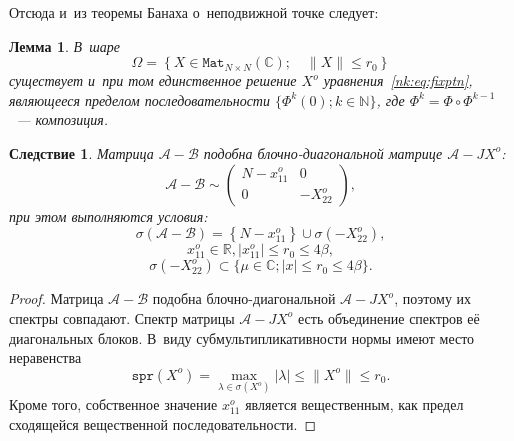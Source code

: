 \documentclass[14pt,a4paper]{extarticle}
\newtheorem{lem}{Лемма}
\newtheorem{crl}{Следствие}
\theoremstyle{definition}
\begin{document}
Отсюда и~из теоремы Банаха о~неподвижной точке следует:
\begin{lem}
В~шаре \[ \Omega = \left\{ X\in\mathtt{Mat}_{N{\times}N}(\mathbb{C}); \quad \|X\| \leq r_0 \right\} \]
    существует и~при том единственное решение \( X^o \) уравнения~\eqref{nk:eq:fixptn},
    являющееся пределом последовательности \( \{ \Phi^k(0); k\in\mathbb{N} \} \),
    где \( \Phi^k = \Phi\circ\Phi^{k-1} \)~--- композиция.
\end{lem}

\begin{crl}
Матрица \( \mathcal{A} - \mathcal{B} \) подобна блочно-диагональной матрице \( \mathcal{A} - J X^o \):
\[ \mathcal{A} - \mathcal{B} \sim
\begin{pmatrix}
N - x_{11}^o & 0 \\
0 & -X_{22}^o
\end{pmatrix}, \]
при этом выполняются условия:
\[ \sigma\left(\mathcal{A} - \mathcal{B}\right) = \left\{N-x_{11}^o\right\}\cup \sigma\left(-X_{22}^o\right), \]
    \[ x_{11}^o\in\mathbb{R}, \lvert x_{11}^o \rvert \leq r_0 \leq 4\beta, \]
\[ \sigma\left(-X_{22}^o\right) \subset \{ \mu\in\mathbb{C}; \lvert x \rvert \leq r_0 \leq 4\beta \}. \]
\end{crl}
\begin{proof}
    Матрица \( \mathcal{A} - \mathcal{B} \) подобна блочно-диагональной \( \mathcal{A} - J X^o \),
    поэтому их спектры совпадают.
    Спектр матрицы \( \mathcal{A} - J X^o \) есть объединение спектров е\"е диагональных блоков.
    В~виду субмультипликативности нормы имеют место неравенства
    \[ \mathtt{spr}(X^o) = \max_{\lambda\in\sigma(X^o)}\lvert\lambda\rvert \leq \|X^o\| \leq r_0. \]
    Кроме того, собственное значение \( x_{11}^o \) является вещественным, как предел сходящейся вещественной последовательности.
\end{proof}
\end{document}
